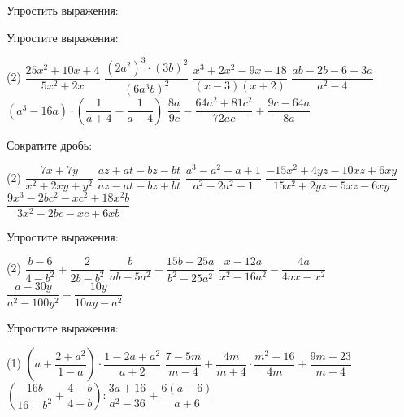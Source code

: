 %
%

\begin{class}[number=1]
	\begin{listofex}
		\item Упростить выражения:
		\begin{itasks}[2]
			\task {}
			\task {}
			\task {}
			\task {}
			\task {}
			\task {}
			\task {}
			\task {}
			\task {}
		\end{itasks}
		\item Упростите выражения:
		\begin{tasks}(2)
			\task \( \dfrac{25x^2+10x+4}{5x^2+2x} \)
			\task \( \dfrac{(2a^2)^3\cdot(3b)^2}{(6a^3b)^2} \)
			\task \( \dfrac{x^3+2x^2-9x-18}{(x-3)(x+2)} \)
			\task \( \dfrac{ab-2b-6+3a}{a^2-4} \)
			\task \( (a^3-16a)\cdot\left( \dfrac{1}{a+4}-\dfrac{1}{a-4} \right) \)
			\task \( \dfrac{8a}{9c}-\dfrac{64a^2+81c^2}{72ac}+\dfrac{9c-64a}{8a} \)
		\end{tasks}
		\item \exercise{1510}
	\end{listofex}
\end{class}

\begin{class}[number=2]
	\begin{listofex}
		\item Сократите дробь:
		\begin{tasks}(2)
			\task \( \dfrac{7x+7y}{x^2+2xy+y^2} \)
			\task \( \dfrac{az+at-bz-bt}{az-at-bz+bt} \)
			\task \( \dfrac{a^3-a^2-a+1}{a^2-2a^2+1} \)
			\task \( \dfrac{-15x^2+4yz-10xz+6xy}{15x^2+2yz-5xz-6xy} \)
			\task \( \dfrac{9x^3-2bc^2-xc^2+18x^2b}{3x^2-2bc-xc+6xb} \)
		\end{tasks}
		\item Упростите выражения:
		\begin{tasks}(2)
			\task \( \dfrac{b-6}{4-b^2}+\dfrac{2}{2b-b^2} \)
			\task \( \dfrac{b}{ab-5a^2}-\dfrac{15b-25a}{b^2-25a^2} \)
			\task \( \dfrac{x-12a}{x^2-16a^2}-\dfrac{4a}{4ax-x^2} \)
			\task \( \dfrac{a-30y}{a^2-100y^2}-\dfrac{10y}{10ay-a^2} \)
		\end{tasks}
		\item Упростите выражения:
		\begin{tasks}(1)
			\task \( \left( a+\dfrac{2+a^2}{1-a} \right)\cdot\dfrac{1-2a+a^2}{a+2} \)
			\task \( \dfrac{7-5m}{m-4}+\dfrac{4m}{m+4}\cdot\dfrac{m^2-16}{4m}+\dfrac{9m-23}{m-4} \)
			\task \( \left( \dfrac{16b}{16-b^2}+\dfrac{4-b}{4+b} \right):\dfrac{3a+16}{a^2-36}+\dfrac{6(a-6)}{a+6} \)
		\end{tasks}
	\end{listofex}
\end{class}

